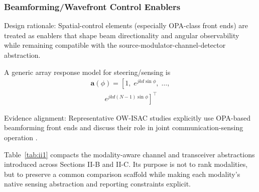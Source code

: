 \documentclass[lettersize,journal]{IEEEtran}
\begin{document}
\subsubsection{Beamforming/Wavefront Control Enablers}
Design rationale: Spatial-control elements (especially OPA-class front ends) are treated as enablers that shape beam directionality and angular observability while remaining compatible with the source-modulator-channel-detector abstraction.

A generic array response model for steering/sensing is
\begin{equation}
\begin{split}
\mathbf{a}(\phi)=\left[1,\;e^{jkd\sin\phi},\;\ldots,\right.\\
\left.\qquad e^{jkd(N-1)\sin\phi}\right]^{\top}
\end{split}
\end{equation}

Evidence alignment: Representative OW-ISAC studies explicitly use OPA-based beamforming front ends and discuss their role in joint communication-sensing operation \cite{O_ISAC_061,O_ISAC_091}.


Table~\ref{tab:ii1} compacts the modality-aware channel and transceiver abstractions introduced across Sections II-B and II-C. Its purpose is not to rank modalities, but to preserve a common comparison scaffold while making each modality's native sensing abstraction and reporting constraints explicit.
\end{document}
